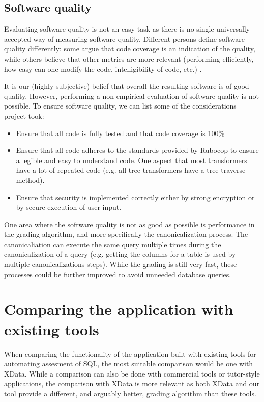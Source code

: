 \subsection{Software quality}

Evaluating software quality is not an easy task as there is no single universally accepted way of measuring software quality. Different persons define software quality differently: some argue that code coverage is an indication of the quality, while others believe that other metrics are more relevant (performing efficiently, how easy can one modify the code, intelligibility of code, etc.) \citep{msft_testing, Boehm:1976:QES:800253.807736}.

It is our (highly subjective) belief that overall the resulting software is of good quality. However, performing a non-empirical evaluation of software quality is not possible. To ensure software quality, we can list some of the considerations project took:
\begin{itemize}
    \item Ensure that all code is fully tested and that code coverage is 100\%
    \item Ensure that all code adheres to the standards provided by Rubocop to ensure a legible and easy to understand code. One aspect that most transformers have a lot of repeated code (e.g. all tree transformers have a tree traverse method).
    \item Ensure that security is implemented correctly either by strong encryption or by secure execution of user input.
\end{itemize}

One area where the software quality is not as good as possible is performance in the grading algorithm, and more specifically the canonicalization process. The canonicaliation can execute the same query multiple times during the canonicalization of a query (e.g. getting the columns for a table is used by multiple canonicalizations steps). While the grading is still very fast, these processes could be further improved to avoid unneeded database queries.

\section{Comparing the application with existing tools}

When comparing the functionality of the application built with existing tools for automating assesment of SQL, the most suitable comparison would be one with XData. While a comparison can also be done with commercial tools or tutor-style applications, the comparison with XData is more relevant as both XData and our tool provide a different, and arguably better, grading algorithm than these tools.

